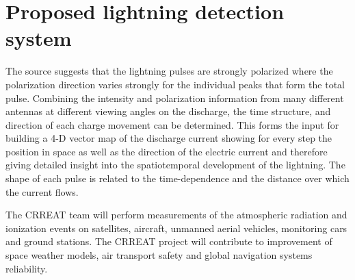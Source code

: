 \documentclass[twoside]{ctuthesis}
\theoremstyle{plain}
\theoremstyle{definition}
\theoremstyle{note}
\begin{document}
\section{Proposed lightning detection system}
The source \cite{LOFAR_lightning} suggests that the lightning pulses are strongly
polarized where the polarization direction varies strongly for the individual peaks that form the
total pulse. Combining the intensity and polarization information from many different antennas
at different viewing angles on the discharge, the time structure, and direction of each charge movement can be determined.  This forms the input for building a 4-D vector map of the discharge current showing for every step the position in space as well as the direction of the
electric current and therefore giving detailed insight into the spatiotemporal development of the
lightning.  The shape of each pulse is related to the time-dependence and the distance over which the current flows.



The CRREAT team will perform measurements of the atmospheric radiation and ionization events on satellites, aircraft, unmanned aerial vehicles, monitoring cars and ground stations. The CRREAT project will contribute to improvement of space weather models, air transport safety and global navigation systems reliability.

\appendix
\end{document}
